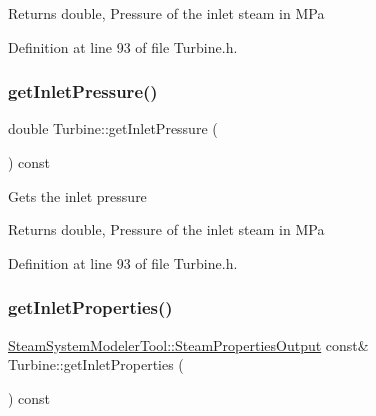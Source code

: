 \begin{DoxyReturn}{Returns}
double, Pressure of the inlet steam in M\+Pa 
\end{DoxyReturn}


Definition at line 93 of file Turbine.\+h.

\mbox{\label{class_turbine_a148ad3877851f1c3931d8a6771d750c5}} 
\subsubsection{\texorpdfstring{get\+Inlet\+Pressure()}{getInletPressure()}\hspace{0.1cm}{\footnotesize\ttfamily [3/3]}}
{\footnotesize\ttfamily double Turbine\+::get\+Inlet\+Pressure (\begin{DoxyParamCaption}{ }\end{DoxyParamCaption}) const\hspace{0.3cm}{\ttfamily [inline]}}

Gets the inlet pressure

\begin{DoxyReturn}{Returns}
double, Pressure of the inlet steam in M\+Pa 
\end{DoxyReturn}


Definition at line 93 of file Turbine.\+h.

\mbox{\label{class_turbine_a7a906cf74affed9acfa4045964eccbf6}} 
\subsubsection{\texorpdfstring{get\+Inlet\+Properties()}{getInletProperties()}\hspace{0.1cm}{\footnotesize\ttfamily [1/3]}}
{\footnotesize\ttfamily \hyperlink{struct_steam_system_modeler_tool_1_1_steam_properties_output}{Steam\+System\+Modeler\+Tool\+::\+Steam\+Properties\+Output} const\& Turbine\+::get\+Inlet\+Properties (\begin{DoxyParamCaption}{ }\end{DoxyParamCaption}) const\hspace{0.3cm}{\ttfamily [inline]}}

